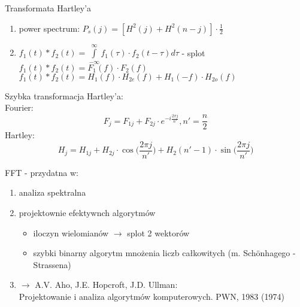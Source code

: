 \begin{frame}[allowframebreaks]{Transformata Hartley'a}
\begin{block}{16.30}
\begin{enumerate}[1$^\circ$]
			\item power spectrum: $P_s(j) = [H^2(j) + H^2(n-j)] \cdot \frac{1}{2}$ \\
			\item $f_1(t) \ast f_2(t) = \int\limits_{-\infty}^{\infty} f_1(\tau) \cdot f_2(t - \tau) d\tau$ \hfill - splot \\
			$f_1(t) \ast f_2(t) = F_1(f) \cdot F_2(f)$ \\
			$f_1(t) \ast f_2(t) = H_1(f) \cdot H_{2e}(f) + H_1(-f) \cdot H_{2o}(f)$
		\end{enumerate}
	\end{block}
	Szybka transformacja Hartley'a: \\
	Fourier:
	\[
		F_j = F_{1j} + F_{2j} \cdot e^{-i\frac{2\pi j}{n'}} , n' = \frac{n}{2}
	\]
	Hartley:
	\[
		H_j = H_{1j} + H_{2j} \cdot \cos \bigg( \frac{2\pi j}{n'} \bigg) + H_2(n'-1) \cdot \sin \bigg( \frac{2\pi j}{n'} \bigg)
	\]
\end{frame}
\begin{frame}{FFT - przydatna w:}
	\begin{enumerate}
		\item analiza spektralna \\
		\item projektownie efektywnch algorytmów
		\begin{itemize}
			\item iloczyn wielomianów $\to$ splot 2 wektorów \\
			\item szybki binarny algorytm mnożenia liczb całkowitych
			(m. Sch\"{o}nhagego - Strassena)
		\end{itemize}
		\item $\to$ A.V. Aho, J.E. Hopcroft, J.D. Ullman: \\
		Projektowanie i analiza algorytmów komputerowych. PWN, 1983 (1974)
	\end{enumerate}
\end{frame}